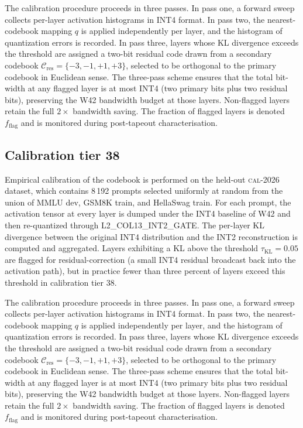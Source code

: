 The calibration procedure proceeds in three passes. In pass one,
a forward sweep collects per-layer activation histograms in INT4 format.
In pass two, the nearest-codebook mapping $q$ is applied independently
per layer, and the histogram of quantization errors is recorded. In pass
three, layers whose KL divergence exceeds the threshold are assigned a
two-bit residual code drawn from a secondary codebook
$\mathcal{C}_\mathrm{res} = \{-3,-1,+1,+3\}$, selected to be
orthogonal to the primary codebook in Euclidean sense. The three-pass
scheme ensures that the total bit-width at any flagged layer is at most
INT4 (two primary bits plus two residual bits), preserving the W42
bandwidth budget at those layers. Non-flagged layers retain the full
$2\times$ bandwidth saving. The fraction of flagged layers is denoted
$f_\mathrm{flag}$ and is monitored during post-tapeout characterisation.


\subsection{Calibration tier 38}

Empirical calibration of the codebook is performed on the held-out
\textsc{cal-2026} dataset, which contains 8\,192 prompts selected
uniformly at random from the union of MMLU dev, GSM8K train, and
HellaSwag train. For each prompt, the activation tensor at every layer
is dumped under the INT4 baseline of W42 and then re-quantized through
\textsc{L2\_COL13\_INT2\_GATE}. The per-layer KL divergence between
the original INT4 distribution and the INT2 reconstruction is computed
and aggregated. Layers exhibiting a KL above the threshold
$\tau_{\mathrm{KL}} = 0.05$ are flagged for residual-correction (a
small INT4 residual broadcast back into the activation path), but in
practice fewer than three percent of layers exceed this threshold in
calibration tier 38.

The calibration procedure proceeds in three passes. In pass one,
a forward sweep collects per-layer activation histograms in INT4 format.
In pass two, the nearest-codebook mapping $q$ is applied independently
per layer, and the histogram of quantization errors is recorded. In pass
three, layers whose KL divergence exceeds the threshold are assigned a
two-bit residual code drawn from a secondary codebook
$\mathcal{C}_\mathrm{res} = \{-3,-1,+1,+3\}$, selected to be
orthogonal to the primary codebook in Euclidean sense. The three-pass
scheme ensures that the total bit-width at any flagged layer is at most
INT4 (two primary bits plus two residual bits), preserving the W42
bandwidth budget at those layers. Non-flagged layers retain the full
$2\times$ bandwidth saving. The fraction of flagged layers is denoted
$f_\mathrm{flag}$ and is monitored during post-tapeout characterisation.


